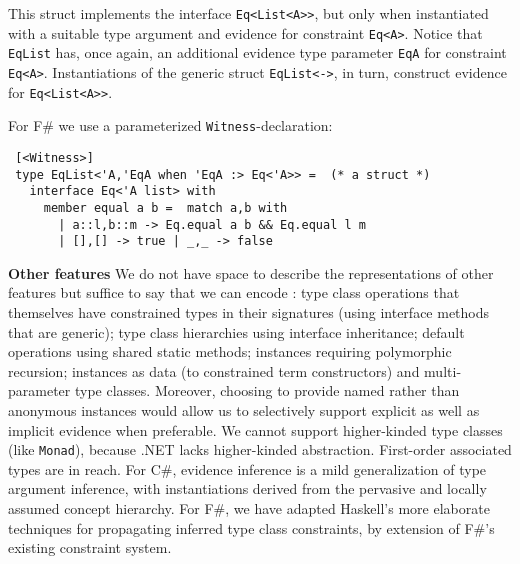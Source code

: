 \documentclass[9pt]{sig-alternate-05-2015}
\newif\ifclassic
\begin{document}
This struct implements the interface \lstinline{Eq<List<A>>}, but only when instantiated with a suitable type argument and evidence for constraint \lstinline{Eq<A>}.
Notice that \lstinline{EqList} has, once again, an additional evidence type parameter  \lstinline{EqA} for constraint \lstinline{Eq<A>}.
Instantiations of the generic struct \lstinline{EqList<->}, in turn, construct evidence for \lstinline{Eq<List<A>>}.

\ifclassic
For F\# we adopt the more concise, nameless declaration:

\lstset{language={FSharp}}
\begin{lstlisting}
instance Eq 'a => Eq (List 'a) where 
  Equal(a,b) = match a,b with
    | (a::l),(b::m) -> Equal(a,b) && Equal(l,m)
    | [],[] -> true | _,_ -> false
\end{lstlisting}
\else
For F\# we use a parameterized \lstinline{Witness}-declaration:
\begin{lstlisting}
 [<Witness>] 
 type EqList<'A,'EqA when 'EqA :> Eq<'A>> =  (* a struct *)
   interface Eq<'A list> with
     member equal a b =  match a,b with
       | a::l,b::m -> Eq.equal a b && Eq.equal l m
       | [],[] -> true | _,_ -> false
\end{lstlisting}

\fi
{\bf Other features}
We do not have space to describe the representations of other features but suffice to say that we can encode \cite{natural}:
type class operations that themselves have constrained types in their signatures (using interface methods that are generic);
type class hierarchies  using interface inheritance; default operations using shared static methods; instances requiring 
polymorphic recursion; instances as data (to constrained term constructors) and multi-parameter type classes. Moreover, choosing to provide named rather than anonymous instances would allow us to selectively support
explicit as well as implicit evidence when preferable. 
We cannot support  higher-kinded type classes (like \lstinline{Monad}), because .NET lacks higher-kinded abstraction.
First-order associated types are in reach.
For C\#, evidence inference is a mild generalization of type argument inference, with instantiations derived from the pervasive and locally assumed concept hierarchy.
For F\#, we have adapted Haskell's more elaborate techniques for propagating inferred type class constraints, by extension of F\#'s existing constraint system.
\end{document}
